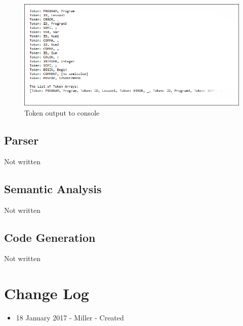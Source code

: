 \documentclass[english]{article}
\begin{document}
\begin{figure}
\begin{center}
\includegraphics[width=1.1\textwidth]{output.PNG}
\end{center}
\caption{\label{Output}Token output to console}
\end{figure}


\subsection{Parser}

Not written

\subsection{Semantic Analysis}

Not written

\subsection{Code Generation}

Not written



\par\addvspace{1cm}%
\section{Change Log}

\begin{itemize}
\item
18 January 2017 - Miller - Created

\end{itemize}
\end{document}
